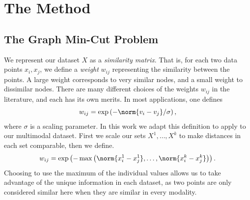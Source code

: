 \documentclass{article}[11pt]
\begin{document}

\section{The Method}
\label{sec:method}

\subsection{The Graph Min-Cut Problem} \label{sec:GraphMinCut} We represent our
dataset $X$ as a \emph{similarity matrix}. That is, for each two data points
$x_i, x_j$, we define a \emph{weight} $w_{ij}$ representing the similarity
between the points. A large weight corresponds to very similar nodes, and a
small weight to dissimilar nodes. There are many different choices of the
weights $w_{ij}$ in the literature, and each has its own merits. In most
applications, one defines
\[w_{ij} = \text{exp}\left(-\norm{v_i -v_j} / \sigma \right),\] where $\sigma$
is a scaling parameter. In this work we adapt this definition to apply to our
multimodal dataset. First we scale our sets $X^1,\ldots, X^k$ to make distances
in each set comparable, then we define.
\[w_{ij} = \text{exp}\left(-\max\left(\norm{x_i^1 - x_j^1}, \ldots, \norm{x_i^k
        - x_j^k}\right)\right).\] Choosing to use the maximum of the individual
values allows us to take advantage of the unique information in each dataset, as
two points are only considered similar here when they are similar in every
modality.
\end{document}
